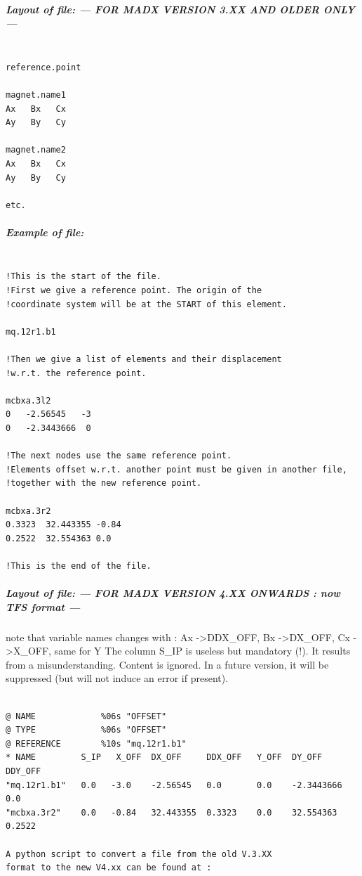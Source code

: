 \begin{itemize}
\subparagraph{Layout of file: --- FOR MADX VERSION 3.XX AND OLDER ONLY--- }
\begin{verbatim}

reference.point

magnet.name1
Ax   Bx   Cx
Ay   By   Cy

magnet.name2
Ax   Bx   Cx
Ay   By   Cy

etc.
\end{verbatim}

\subparagraph{Example of file:}
\begin{verbatim}

!This is the start of the file.
!First we give a reference point. The origin of the 
!coordinate system will be at the START of this element.

mq.12r1.b1

!Then we give a list of elements and their displacement 
!w.r.t. the reference point.

mcbxa.3l2
0   -2.56545   -3
0   -2.3443666  0

!The next nodes use the same reference point.
!Elements offset w.r.t. another point must be given in another file,
!together with the new reference point.

mcbxa.3r2
0.3323  32.443355 -0.84
0.2522  32.554363 0.0

!This is the end of the file.
\end{verbatim}

\subparagraph{Layout of file: --- FOR MADX VERSION 4.XX ONWARDS : now TFS format --- } note that variable names changes with : Ax -\textgreater DDX\_OFF,   Bx -\textgreater DX\_OFF,  Cx -\textgreater X\_OFF, same for Y The column S\_IP is useless but mandatory (!). It results from a misunderstanding. Content is ignored. In a future version, it will be suppressed (but will not induce an error if present). 
\begin{verbatim}

@ NAME             %06s "OFFSET" 
@ TYPE             %06s "OFFSET" 
@ REFERENCE        %10s "mq.12r1.b1" 
* NAME         S_IP   X_OFF  DX_OFF     DDX_OFF   Y_OFF  DY_OFF      DDY_OFF
"mq.12r1.b1"   0.0   -3.0    -2.56545   0.0       0.0    -2.3443666  0.0
"mcbxa.3r2"    0.0   -0.84   32.443355  0.3323    0.0    32.554363   0.2522

A python script to convert a file from the old V.3.XX 
format to the new V4.xx can be found at :


\end{verbatim}
\end{itemize}
